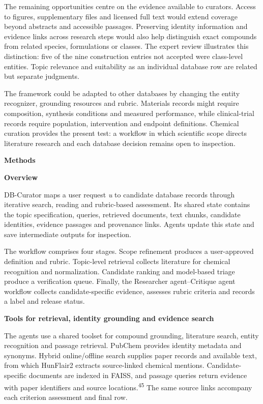 \documentclass[
]{article}
\begin{document}
The remaining opportunities centre on the evidence available to curators. Access to figures, supplementary files and licensed full text would extend coverage beyond abstracts and accessible passages. Preserving identity information and evidence links across research steps would also help distinguish exact compounds from related species, formulations or classes. The expert review illustrates this distinction: five of the nine construction entries not accepted were class-level entities. Topic relevance and suitability as an individual database row are related but separate judgments.

The framework could be adapted to other databases by changing the entity recognizer, grounding resources and rubric. Materials records might require composition, synthesis conditions and measured performance, while clinical-trial records require population, intervention and endpoint definitions. Chemical curation provides the present test: a workflow in which scientific scope directs literature research and each database decision remains open to inspection.

\textbf{Methods}

\textbf{Overview}

DB-Curator maps a user request \emph{u} to candidate database records through iterative search, reading and rubric-based assessment. Its shared state contains the topic specification, queries, retrieved documents, text chunks, candidate identities, evidence passages and provenance links. Agents update this state and save intermediate outputs for inspection.

The workflow comprises four stages. Scope refinement produces a user-approved definition and rubric. Topic-level retrieval collects literature for chemical recognition and normalization. Candidate ranking and model-based triage produce a verification queue. Finally, the Researcher agent--Critique agent workflow collects candidate-specific evidence, assesses rubric criteria and records a label and release status.

\textbf{Tools for retrieval, identity grounding and evidence search}

The agents use a shared toolset for compound grounding, literature search, entity recognition and passage retrieval. PubChem provides identity metadata and synonyms. Hybrid online/offline search supplies paper records and available text, from which HunFlair2 extracts source-linked chemical mentions. Candidate-specific documents are indexed in FAISS, and passage queries return evidence with paper identifiers and source locations.\textsuperscript{45} The same source links accompany each criterion assessment and final row.
\end{document}
